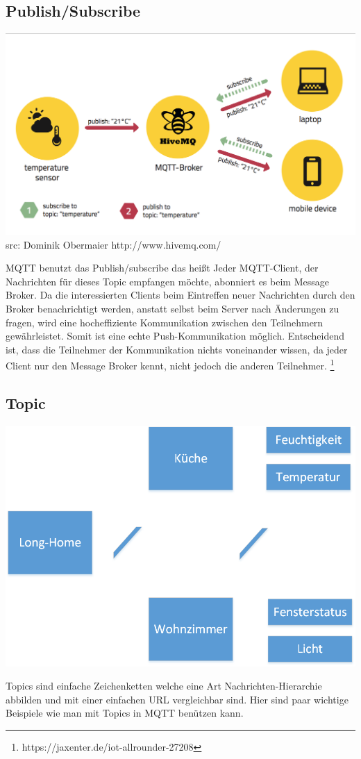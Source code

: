 \subsection{Publish/Subscribe}
\begin{center}
\includegraphics[scale=0.4]{hivemq.png}
src: Dominik Obermaier http://www.hivemq.com/
\end{center}
MQTT benutzt das Publish/subscribe das heißt Jeder MQTT-Client, der Nachrichten für dieses Topic empfangen möchte, abonniert es beim Message Broker.
Da die interessierten Clients beim Eintreffen neuer Nachrichten durch den Broker benachrichtigt werden, anstatt selbst beim Server nach Änderungen zu fragen, wird eine hocheffiziente Kommunikation zwischen den Teilnehmern gewährleistet.
Somit ist eine echte Push-Kommunikation möglich. Entscheidend ist, dass die Teilnehmer der Kommunikation nichts voneinander wissen, da jeder Client nur den Message Broker kennt, nicht jedoch die anderen Teilnehmer.
\footnote{https://jaxenter.de/iot-allrounder-27208}
	
\subsection{Topic}
\begin{center}
\includegraphics[scale=0.6]{mqtttopic.png}
\end{center}
Topics sind einfache Zeichenketten welche eine Art Nachrichten-Hierarchie abbilden und mit einer einfachen URL vergleichbar sind. Hier sind paar wichtige Beispiele wie man mit Topics in MQTT benützen kann.

